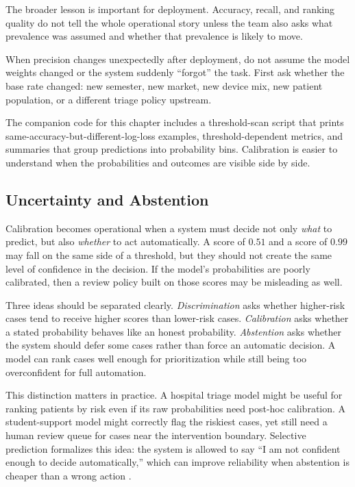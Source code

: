 The broader lesson is important for deployment. Accuracy, recall, and ranking quality do not tell the whole operational story unless the team also asks what prevalence was assumed and whether that prevalence is likely to move.

\begin{practicalnote}
When precision changes unexpectedly after deployment, do not assume the model weights changed or the system suddenly ``forgot'' the task. First ask whether the base rate changed: new semester, new market, new device mix, new patient population, or a different triage policy upstream.
\end{practicalnote}

\begin{practicalnote}
The companion code for this chapter includes a threshold-scan script that prints same-accuracy-but-different-log-loss examples, threshold-dependent metrics, and summaries that group predictions into probability bins. Calibration is easier to understand when the probabilities and outcomes are visible side by side.
\end{practicalnote}

\subsection{Uncertainty and Abstention}

Calibration becomes operational when a system must decide not only \emph{what} to predict, but also \emph{whether} to act automatically. A score of $0.51$ and a score of $0.99$ may fall on the same side of a threshold, but they should not create the same level of confidence in the decision. If the model's probabilities are poorly calibrated, then a review policy built on those scores may be misleading as well.

Three ideas should be separated clearly. \emph{Discrimination} asks whether higher-risk cases tend to receive higher scores than lower-risk cases. \emph{Calibration} asks whether a stated probability behaves like an honest probability. \emph{Abstention} asks whether the system should defer some cases rather than force an automatic decision. A model can rank cases well enough for prioritization while still being too overconfident for full automation.

This distinction matters in practice. A hospital triage model might be useful for ranking patients by risk even if its raw probabilities need post-hoc calibration. A student-support model might correctly flag the riskiest cases, yet still need a human review queue for cases near the intervention boundary. Selective prediction formalizes this idea: the system is allowed to say ``I am not confident enough to decide automatically,'' which can improve reliability when abstention is cheaper than a wrong action \citep{geifman2017}.

